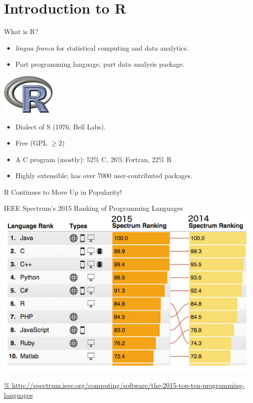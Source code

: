 \section{Introduction to R}

\begin{frame}{What is R?}
  \begin{minipage}{.675\textwidth}
  \begin{itemize}[<+-|alert@+>]
    \item \emph{lingua franca} for statistical computing and data analytics.
    \item Part programming language, part data analysis package.
  \end{itemize}
  \end{minipage}
  \hfill
  \begin{minipage}{.3\textwidth}
    \centering\includegraphics[scale=.85]{../common/pics/Rlogo}
  \end{minipage}
  \begin{itemize}
    \item Dialect of S (1976, Bell Labs).
    \item Free (GPL $\geq 2$)
    \item A C program (mostly): 52\% C, 26\% Fortran, 22\% R
    \item Highly extensible; has over 7000 user-contributed packages.
  \end{itemize}
\end{frame}

\begin{frame}{R Continues to Move Up in Popularity!}
\vspace{-2em}
  \begin{center}
    IEEE Spectrum's 2015 Ranking of Programming Languages\\[1ex]
    \includegraphics[scale=.45]{../common/pics/IEEE_Spectrum_Rank.png}
  \end{center}
  \vspace{-3em}
 {\scriptsize
\url{%
http://spectrum.ieee.org/computing/software/the-2015-top-ten-programming-languages
}}
\end{frame}


